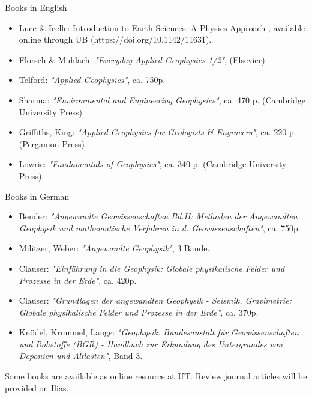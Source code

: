 \documentclass[letterpaper]{inzane_syllabus} %
\begin{document}
{\color{myCOLOR} Books in English}\\
\begin{itemize} 
\item  Luce \& Icelle: Introduction to Earth Sciences: A Physics Approach , available online through UB (https://doi.org/10.1142/11631). 
\item Florsch \& Muhlach: \textit{"Everyday Applied Geophysics 1/2"}, (Elsevier).
    
\item Telford: \textit{"Applied Geophysics"}, ca. 750p. 

\item Sharma: \textit{"Environmental and Engineering Geophysics"}, ca. 470 p. (Cambridge University Press)

\item Griffiths, King: \textit{"Applied Geophysics for Geologists \& Engineers"}, ca. 220 p. (Pergamon Press)

\item Lowrie: \textit{"Fundamentals of Geophysics"}, ca. 340 p. (Cambridge University Press)
\end{itemize}
{\color{myCOLOR} Books in German}\\
\begin{itemize}
\item Bender: \textit{"Angewandte Geowissenschaften Bd.II: Methoden der Angewandten Geophysik und mathematische Verfahren in d. Geowissenschaften"}, ca. 750p. 

\item Militzer, Weber: \textit{"Angewandte Geophysik"}, 3 Bände. 

\item Clauser: \textit{"Einführung in die Geophysik: Globale physikalische Felder und Prozesse in der Erde"}, ca. 420p. 

\item Clauser: \textit{"Grundlagen der angewandten Geophysik - Seismik, Gravimetrie: Globale physikalische Felder und Prozesse in der Erde"}, ca. 370p. 

\item Knödel, Krummel, Lange: \textit{"Geophysik. Bundesanstalt für Geowissenschaften und Rohstoffe (BGR) - Handbuch zur Erkundung des Untergrundes von Deponien und Altlasten"}, Band 3. \\
\end{itemize}

Some books are available as online resource at UT. Review journal articles will be provided on Ilias. 
\end{document}
